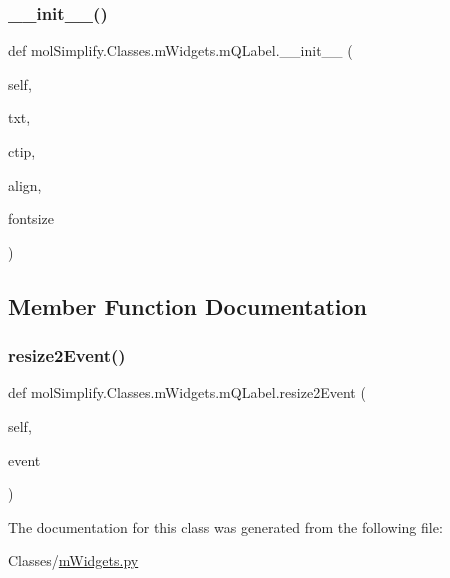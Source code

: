 \subsubsection{\texorpdfstring{\+\_\+\+\_\+init\+\_\+\+\_\+()}{\_\_init\_\_()}}
{\footnotesize\ttfamily def mol\+Simplify.\+Classes.\+m\+Widgets.\+m\+Q\+Label.\+\_\+\+\_\+init\+\_\+\+\_\+ (\begin{DoxyParamCaption}\item[{}]{self,  }\item[{}]{txt,  }\item[{}]{ctip,  }\item[{}]{align,  }\item[{}]{fontsize }\end{DoxyParamCaption})}



\subsection{Member Function Documentation}
\mbox{\label{classmolSimplify_1_1Classes_1_1mWidgets_1_1mQLabel_ac4b868e52cbb2ef6f8974cef329f6dba}} 
\subsubsection{\texorpdfstring{resize2\+Event()}{resize2Event()}}
{\footnotesize\ttfamily def mol\+Simplify.\+Classes.\+m\+Widgets.\+m\+Q\+Label.\+resize2\+Event (\begin{DoxyParamCaption}\item[{}]{self,  }\item[{}]{event }\end{DoxyParamCaption})}



The documentation for this class was generated from the following file\+:\begin{DoxyCompactItemize}
\item 
Classes/\hyperlink{mWidgets_8py}{m\+Widgets.\+py}\end{DoxyCompactItemize}
